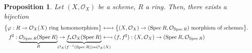\documentclass[12pt]{article}
\DeclareMathOperator{\Spec}{Spec}
\newtheorem*{proposition}{Proposition}
\theoremstyle{definition}
\begin{document}
\begin{proposition}
Let $(X,\mathcal{O}_X)$ be a scheme, $R$ a ring. Then, there exists a bijection
\begin{align*}
\big\{\varphi:R\rightarrow\mathcal{O}_X(X)\text{ ring homomorphism}\big\}&\xleftrightarrow{\hspace{4.4mm}}\big\{(X,\mathcal{O}_X)\rightarrow(\Spec R,\mathcal{O}_{\Spec R})\text{ morphism of schemes}\big\}.\\
f^{\sharp}:\underbrace{\mathcal{O}_{\Spec R}(\Spec R)}_R\rightarrow\underbrace{f_*\mathcal{O}_X(\Spec R)}_{\mathclap{\mathcal{O}_X(f^{-1}(\Spec R))=\mathcal{O}_X(X)}}&\longleftarrow\!\shortmid(f,f^{\sharp}):(X,\mathcal{O}_X)\rightarrow(\Spec R,\mathcal{O}_{\Spec R})
\end{align*}
\end{proposition}
\end{document}
